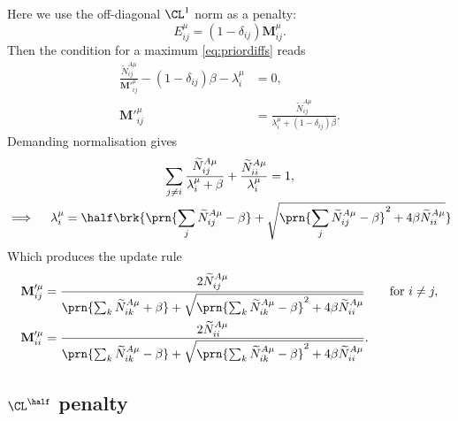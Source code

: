 \documentclass[12pt]{article}
\newcommand{\M}{\mathbf{M}}
\begin{document}
Here we use the off-diagonal $\CL^1$ norm as a penalty:
%
\begin{equation}\label{eq:L1penalty}
  E^\mu_{ij} = (1-\delta_{ij}) \M^\mu_{ij}.
\end{equation}
%
Then the condition for a maximum \eqref{eq:priordiffs} reads
%
\begin{equation}\label{eq:L1priormax}
\begin{aligned}
  \frac{ \widetilde{N}^{A\mu}_{ij} }{ \M'^\mu_{ij} }  - (1-\delta_{ij})\beta - \lambda^\mu_{i} &= 0, \\
   \M'^\mu_{ij} &= \frac{\widetilde{N}^{A\mu}_{ij}}{\lambda^\mu_{i}+(1-\delta_{ij})\beta}.
\end{aligned}
\end{equation}
%
Demanding normalisation gives
%
\begin{multline}\label{eq:L1norm}
  \sum_{j \neq i}\frac{\widetilde{N}^{A\mu}_{ij}}{\lambda^\mu_{i}+\beta} +\frac{\widetilde{N}^{A\mu}_{ii}}{\lambda^\mu_{i}} = 1, \\
  \implies \quad
  \lambda^\mu_{i} = \half \brk{ \prn{\sum_j \widetilde{N}^{A\mu}_{ij} -\beta} + 
     \sqrt{\prn{\sum_j \widetilde{N}^{A\mu}_{ij} -\beta}^2 +4\beta\widetilde{N}^{A\mu}_{ii}}}
\end{multline}
%
Which produces the update rule
%
\begin{equation}\label{eq:L1update}
\begin{aligned}
  \M'^\mu_{ij} &= \frac{ 2\widetilde{N}^{A\mu}_{ij} }{ \prn{\sum_k \widetilde{N}^{A\mu}_{ik} +\beta} +
     \sqrt{\prn{\sum_k \widetilde{N}^{A\mu}_{ik} -\beta}^2 +4\beta\widetilde{N}^{A\mu}_{ii}} } 
     \qquad \text{for } i\neq j, \\
  \M'^\mu_{ii} &= \frac{ 2\widetilde{N}^{A\mu}_{ii} }{ \prn{\sum_k \widetilde{N}^{A\mu}_{ik} -\beta} +
     \sqrt{\prn{\sum_k \widetilde{N}^{A\mu}_{ik} -\beta}^2 +4\beta\widetilde{N}^{A\mu}_{ii}} }.
\end{aligned}
\end{equation}
%


\subsection{\texorpdfstring{$\CL^\half$}{L\textasciicircum1/2} penalty \label{sec:Lhalf}}
\end{document}
